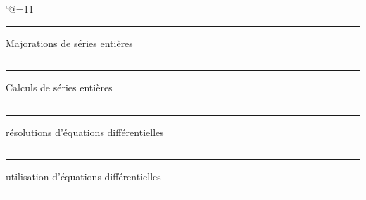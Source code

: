 \catcode`@=11\relax



\vglue-10mm
\bigskip

\hrule
\centerline{Majorations de séries entières}
\hrule
\bigskip
{}
\hrule
\centerline{Calculs de séries entières}
\hrule
{}
\bigskip
{}
\bigskip
{}
\bigskip
{}

\hrule
\centerline{résolutions d'équations différentielles}
\hrule
\bigskip
{}
\bigskip
{}
\bigskip
\hrule
\centerline{utilisation d'équations différentielles}
\hrule
\bigskip


\bigskip
{}



\bigskip
{}
\bigskip

\bigskip
{}
\bigskip
{}
\bigskip
\vfill\vfill\vfill\vfil\vfill\vfill\vfill\vfill\vfill\vfill\vfill\vfill\null
\bye